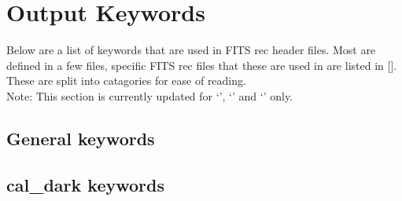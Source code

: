 \section{Output Keywords}
\label{section:the_out_keywords}




Below are a list of keywords that are used in FITS rec header files. Most are
defined in a few files, specific FITS rec files that these are used in are listed in []. These are split into catagories for ease of reading. \\

\noindent Note: This section is currently updated for `\caldark', `\calloc' and `\calslit' only.


\vspace{0.5cm}
\subsection{General keywords}


\vspace{0.5cm}
\subsection{cal\_dark keywords}






